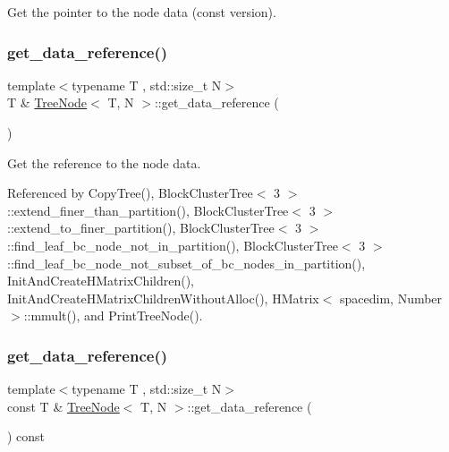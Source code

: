 Get the pointer to the node data (const version). \mbox{\label{classTreeNode_a7bf414928c965e707e0246f7a90a747d}} 
\subsubsection{\texorpdfstring{get\+\_\+data\+\_\+reference()}{get\_data\_reference()}\hspace{0.1cm}{\footnotesize\ttfamily [1/2]}}
{\footnotesize\ttfamily template$<$typename T , std\+::size\+\_\+t N$>$ \\
T \& \hyperlink{classTreeNode}{Tree\+Node}$<$ T, N $>$\+::get\+\_\+data\+\_\+reference (\begin{DoxyParamCaption}{ }\end{DoxyParamCaption})}

Get the reference to the node data. 

Referenced by Copy\+Tree(), Block\+Cluster\+Tree$<$ 3 $>$\+::extend\+\_\+finer\+\_\+than\+\_\+partition(), Block\+Cluster\+Tree$<$ 3 $>$\+::extend\+\_\+to\+\_\+finer\+\_\+partition(), Block\+Cluster\+Tree$<$ 3 $>$\+::find\+\_\+leaf\+\_\+bc\+\_\+node\+\_\+not\+\_\+in\+\_\+partition(), Block\+Cluster\+Tree$<$ 3 $>$\+::find\+\_\+leaf\+\_\+bc\+\_\+node\+\_\+not\+\_\+subset\+\_\+of\+\_\+bc\+\_\+nodes\+\_\+in\+\_\+partition(), Init\+And\+Create\+H\+Matrix\+Children(), Init\+And\+Create\+H\+Matrix\+Children\+Without\+Alloc(), H\+Matrix$<$ spacedim, Number $>$\+::mmult(), and Print\+Tree\+Node().

\mbox{\label{classTreeNode_ab051909179e64f75d4588b4618049193}} 
\subsubsection{\texorpdfstring{get\+\_\+data\+\_\+reference()}{get\_data\_reference()}\hspace{0.1cm}{\footnotesize\ttfamily [2/2]}}
{\footnotesize\ttfamily template$<$typename T , std\+::size\+\_\+t N$>$ \\
const T \& \hyperlink{classTreeNode}{Tree\+Node}$<$ T, N $>$\+::get\+\_\+data\+\_\+reference (\begin{DoxyParamCaption}{ }\end{DoxyParamCaption}) const}

